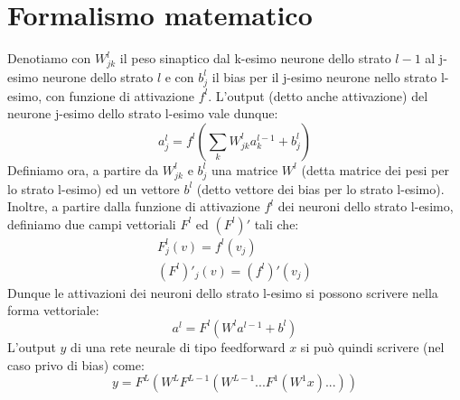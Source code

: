 \documentclass[Lau, noexaminfo, oneside]{sapthesis} %
\begin{document}
\section{Formalismo matematico}
Denotiamo con $W_{jk}^l$ il peso sinaptico dal k-esimo neurone dello strato $l-1$ al j-esimo neurone dello strato $l$ e con $b^l_j$ il bias per il j-esimo neurone nello strato l-esimo, con funzione di attivazione $f^l$.
L'output (detto anche attivazione) del neurone j-esimo dello strato l-esimo vale dunque:
\begin{equation}
a_j^l = f^l(\sum_k W_{jk}^l a_k^{l-1} + b_j^l)
\label{attivazioni}
\end{equation}
Definiamo ora, a partire da $W_{jk}^l$ e $b^l_j$ una matrice $W^l$ (detta matrice dei pesi per lo strato l-esimo) ed un vettore $b^l$ (detto vettore dei bias per lo strato l-esimo).
Inoltre, a partire dalla funzione di attivazione $f^l$ dei neuroni dello strato l-esimo, definiamo due campi vettoriali $F^l$ ed $(F^l)'$ tali che:
\begin{align}
F^l_j(v) = f^l(v_j)\\
(F^l)'_j(v) = (f^l)'(v_j)
\end{align}
Dunque le attivazioni dei neuroni dello strato l-esimo si possono scrivere nella forma vettoriale:
\begin{equation}
a^l = F^l(W^l a^{l-1} + b^l)
\end{equation}
L'output $y$ di una rete neurale di tipo feedforward $x$ si può quindi scrivere (nel caso privo di bias) come:
\begin{equation}
y = F^L (W^L F^{L-1}(W^{L-1} ... F^1 ( W^1 x ) ... ))
\end{equation}
\end{document}

